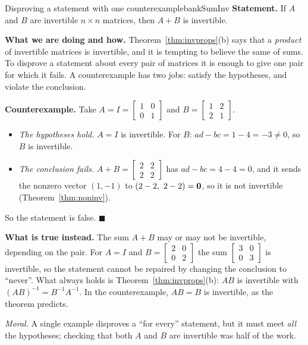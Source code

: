 \documentclass[11pt]{article}
\begin{document}
\begin{exmp}{Disproving a statement with one counterexample}{bankSumInv}
\textbf{Statement.} If $A$ and $B$ are invertible $n\times n$ matrices, then $A+B$ is invertible.

\textbf{What we are doing and how.} Theorem~\ref{thm:invprops}(b) says that a \emph{product} of invertible matrices is invertible, and it is tempting to believe the same of sums. To disprove a statement about every pair of matrices it is enough to give one pair for which it fails. A counterexample has two jobs: satisfy the hypotheses, and violate the conclusion.

\textbf{Counterexample.} Take $A=I=\begin{bmatrix}1&0\\0&1\end{bmatrix}$ and $B=\begin{bmatrix}1&2\\2&1\end{bmatrix}$.
\begin{itemize}
  \item \emph{The hypotheses hold.} $A=I$ is invertible. For $B$: $ad-bc=1-4=-3\neq0$, so $B$ is invertible.
  \item \emph{The conclusion fails.} $A+B=\begin{bmatrix}2&2\\2&2\end{bmatrix}$ has $ad-bc=4-4=0$, and it sends the nonzero vector $(1,-1)$ to $(2-2,\ 2-2)=\mathbf{0}$, so it is not invertible (Theorem~\ref{thm:noninv}).
\end{itemize}
So the statement is false. \qquad$\blacksquare$

\textbf{What is true instead.} The sum $A+B$ may or may not be invertible, depending on the pair. For $A=I$ and $B=\begin{bmatrix}2&0\\0&2\end{bmatrix}$ the sum $\begin{bmatrix}3&0\\0&3\end{bmatrix}$ is invertible, so the statement cannot be repaired by changing the conclusion to ``never''. What always holds is Theorem~\ref{thm:invprops}(b): $AB$ is invertible with $(AB)^{-1}=B^{-1}A^{-1}$. In the counterexample, $AB=B$ is invertible, as the theorem predicts.

\emph{Moral.} A single example disproves a ``for every'' statement, but it must meet \emph{all} the hypotheses; checking that both $A$ and $B$ are invertible was half of the work.
\end{exmp}
\end{document}
